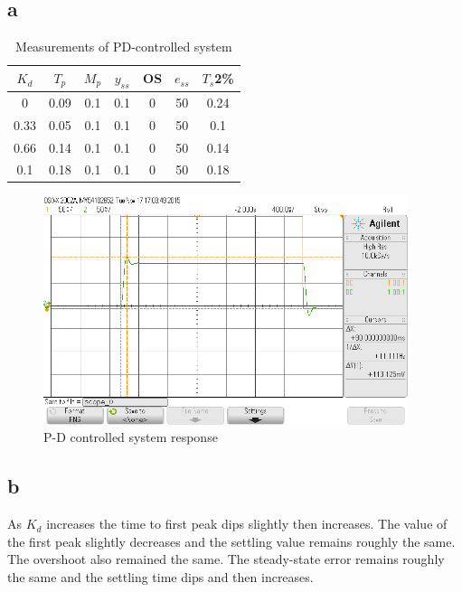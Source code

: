 \documentclass{article}
\begin{document}
\subsection*{a} %
\begin{table}[!htbp]
\centering
    \begin{tabular}{|c|c|c|c|c|c|c|}
        \hline
        $K_d$ & $T_p$ & $M_p$ & $y_{ss}$ & OS & $e_{ss}$ & $T_s$2\% \\
        \hline
        0 & 0.09 & 0.1 & 0.1 & 0  & 50 & 0.24\\
        \hline
        0.33 & 0.05 & 0.1 & 0.1 & 0  & 50 & 0.1\\
        \hline
        0.66 & 0.14 & 0.1 & 0.1 & 0  & 50 & 0.14\\
        \hline
        0.1 & 0.18 & 0.1 & 0.1 & 0  & 50 & 0.18\\
        \hline
    \end{tabular}
    \caption{Measurements of PD-controlled system}
\end{table}

\begin{figure}[!htbp]
    \centering
    \includegraphics[width=0.95\textwidth]{5_4.png}
    \caption{P-D controlled system response}
\end{figure}
\subsection*{b} %
As $K_d$ increases the time to first peak dips slightly then increases. The value of the first peak slightly decreases and the settling value remains roughly the same. The overshoot also remained the same. The steady-state error remains roughly the same and the settling time dips and then increases.
\end{document}
